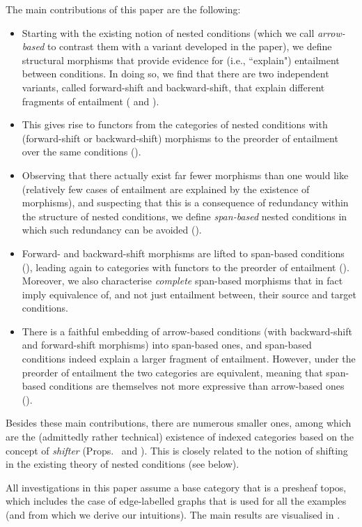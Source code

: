 The main contributions of this paper are the following:

\begin{itemize}
\item Starting with the existing notion of nested conditions (which we call \emph{arrow-based} to contrast them with a variant developed in the paper), we define structural morphisms that provide evidence for (i.e., ``explain") entailment between conditions. In doing so, we find that there are two independent variants, called forward-shift and backward-shift, that explain different fragments of entailment ( and ).

\item This gives rise to functors from the categories of nested conditions with (forward-shift or backward-shift) morphisms to the preorder of entailment over the same conditions ().

\item Observing that there actually exist far fewer morphisms than one would like (relatively few cases of entailment are explained by the existence of morphisms), and suspecting that this is a consequence of redundancy within the structure of nested conditions, we define \emph{span-based} nested conditions in which such redundancy can be avoided ().

\item Forward- and backward-shift morphisms are lifted to span-based conditions (), leading again to categories with functors to the preorder of entailment (). Moreover, we also characterise \emph{complete} span-based morphisms that in fact imply equivalence of, and not just entailment between, their source and target conditions.

\item There is a faithful embedding of arrow-based conditions (with backward-shift and forward-shift morphisms) into span-based ones, and span-based conditions indeed explain a larger fragment of entailment. However, under the preorder of entailment the two categories are equivalent, meaning that span-based conditions are themselves not more expressive than arrow-based ones ().
\end{itemize}
%
Besides these main contributions, there are numerous smaller ones, among which are the (admittedly rather technical) existence of indexed categories based on the concept of \emph{shifter} (Props.\  and ). This is closely related to the notion of shifting in the existing theory of nested conditions (see below).

All investigations in this paper assume a base category that is a presheaf topos, which includes the case of edge-labelled graphs that is used for all the examples (and from which we derive our intuitions). The main results are visualised in .
